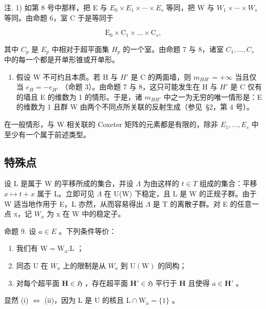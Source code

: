 注. 1) 如第 8 号中那样，把 E 与 \(E_{0} \times E_{1} \times \cdots \times E_{s}\) 等同，把 W 与 \(W_{1} \times \cdots \times W_{s}\) 等同。由命题 6，室 C 于是等同于

\[
\mathrm{E} _ {0} \times \mathrm{C} _ {1} \times \dots \times \mathrm{C} _ {s},
\]

其中 \(C_{p}\) 是 \(E_{p}\) 中相对于超平面集 \(H_{p}\) 的一个室。由命题 7 与 8，诸室 \(C_{1},\ldots,C_{s}\) 中的每一个都是开单形锥或开单形。

\begin{enumerate}
\def\labelenumi{\arabic{enumi})}
\setcounter{enumi}{1}
\tightlist
\item
  假设 W 不可约且本质。若 H 与 \(H'\) 是 C 的两面墙，则 \(m_{HH'} = +\infty\) 当且仅当 \(e_{H} = -e_{H'}\) （命题 3）。由命题 7 与 8，这只可能发生在 H 与 \(H'\) 是 C 仅有的墙且 E 的维数为 1 的情形。于是，诸 \(m_{HH'}\) 中之一为无穷的唯一情形是：E 的维数为 1 且群 W 由两个不同点所关联的反射生成（参见~§2，第 4 号）。
\end{enumerate}

在一般情形，与 W 相关联的 Coxeter 矩阵的元素都是有限的，除非 \(E_{1},\ldots,E_{s}\) 中至少有一个属于前述类型。

\subsection{特殊点}

设 L 是属于 W 的平移所成的集合，并设 \(\Lambda\) 为由这样的 \(t \in T\) 组成的集合：平移 \(x \mapsto t + x\) 属于 L。立即可见 \(\Lambda\) 在 U(W) 下稳定，且 L 是 W 的正规子群。由于 W 适当地作用于 E，L 亦然，从而容易得出 \(\Lambda\) 是 T 的离散子群。对 E 的任意一点 x，记 \(W_x\) 为 x 在 W 中的稳定子。

命题 9. 设 \(a \in E\) 。下列条件等价：

\begin{enumerate}
\def\labelenumi{(\roman{enumi})}
\item
  我们有 \(\mathrm{W} = \mathrm{W}_{a}.\mathrm{L}\) ；
\item
  同态 U 在 \(W_{a}\) 上的限制是从 \(W_{a}\) 到 \(\mathrm{U}(\mathrm{W})\) 的同构；
\item
  对每个超平面 \(\mathbf{H} \in \mathfrak{H}\) ，存在超平面 \(\mathbf{H}' \in \mathfrak{H}\) 平行于 \(\mathbf{H}\) 且使得 \(a \in \mathbf{H}'\) 。
\end{enumerate}

显然 (i) \(\Leftrightarrow\) (ii)，因为 L 是 U 的核且 \(\mathrm{L} \cap \mathrm{W}_a = \{1\}\) 。

